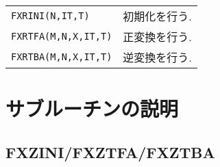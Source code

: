 \documentclass[a4j]{jsarticle}
\begin{document}
  \vspace{1ex}
  
  \begin{tabular}{ll}
    \texttt{FXRINI(N,IT,T)} & 初期化を行う.\\
    \texttt{FXRTFA(M,N,X,IT,T)} & 正変換を行う.\\
    \texttt{FXRTBA(M,N,X,IT,T)} & 逆変換を行う.
  \end{tabular}

\newpage  
  
\section{サブルーチンの説明}

\subsection{FXZINI/FXZTFA/FXZTBA}
\end{document}
